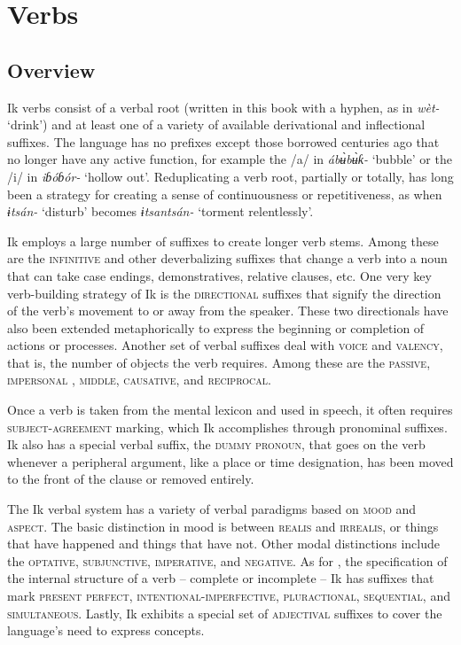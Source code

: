 \section{Verbs}\label{sec:8}



\subsection{Overview}\label{sec:8.1}


Ik verbs consist of a verbal root (written in this book with a hyphen, as in \textit{wèt-} ‘drink’) and at least one of a variety of available derivational and inflectional suffixes. The language has no prefixes except those borrowed centuries ago that no longer have any active function, for example the /a/ in \textit{áb\`{ʉ}b\`{ʉ}ƙ-} ‘bubble’ or the /i/ in \textit{iɓóɓór-} ‘hollow out’. Reduplicating a verb root, partially or totally, has long been a strategy for creating a sense of continuousness or repetitiveness, as when \textit{ɨtsán-} ‘disturb’ becomes \textit{ɨtsan{\Í}tsán-} ‘torment relentlessly’. 

Ik employs a large number of suffixes to create longer verb stems. Among these are the \textsc{infinitive} and other deverbalizing suffixes that change a verb into a noun that can take case endings, demonstratives, relative clauses, etc. One very key verb-building strategy of Ik is the \textsc{directional} suffixes that signify the direction of the verb’s movement to or away from the speaker. These two directionals have also been extended metaphorically to express the beginning or completion of actions or processes. Another set of verbal suffixes deal with \textsc{voice} and \textsc{valency}, that is, the number of objects the verb requires. Among these are the \textsc{passive}, \textsc{impersonal} , \textsc{middle}, \textsc{causative}, and \textsc{reciprocal}.

Once a verb is taken from the mental lexicon and used in speech, it often requires \textsc{subject-agreement} marking, which Ik accomplishes through pronominal suffixes. Ik also has a special verbal suffix, the \textsc{dummy} \textsc{pronoun}, that goes on the verb whenever a peripheral argument, like a place or time designation, has been moved to the front of the clause or removed entirely.

The Ik verbal system has a variety of verbal paradigms based on \textsc{mood} and \textsc{aspect}. The basic distinction in mood is between \textsc{realis} and \textsc{irrealis}, or things that have happened and things that have not. Other modal distinctions include the \textsc{optative}, \textsc{subjunctive}, \textsc{imperative}, and \textsc{negative}. As for , the specification of the internal structure of a verb – complete or incomplete – Ik has suffixes that mark \textsc{present perfect}, \textsc{intentional}{}-\textsc{imperfective}, \textsc{pluractional}, \textsc{sequential}, and \textsc{simultaneous}. Lastly, Ik exhibits a special set of \textsc{adjectival} suffixes to cover the language’s need to express  concepts.




